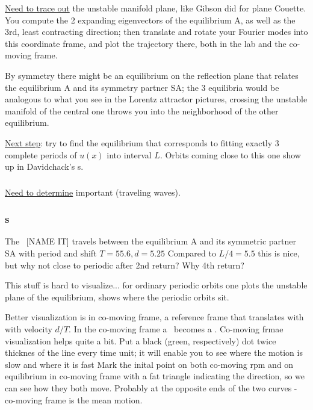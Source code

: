 \underline{Need to trace out}
the unstable manifold plane, like Gibson did for plane Couette.
You compute the 2 expanding eigenvectors of the
equilibrium A, as well as the 3rd, least contracting direction; then
translate and rotate your Fourier modes into this coordinate frame,
and plot the trajectory there, both in the lab and the co-moving frame.

By symmetry there might be an equilibrium on the reflection plane that
relates the equilibrium A and its symmetry partner SA; the 3 equilibria would
be analogous to what you see in the Lorentz attractor pictures, crossing
the unstable manifold of the central one throws you into the neighborhood
of the other equilibrium.

\underline{Next step}: try to find the equilibrium that corresponds to fitting
exactly 3 complete periods of $u(x)$ into interval $L$.
Orbits coming close to this one
show up in Davidchack's \rpo s.

\subsubsection{\Reqva}

\underline{Need to determine} important {\Reqva} (traveling waves).

\subsubsection{\Rpo s}


The \rpo\ [NAME IT] travels between the equilibrium A and its symmetric partner SA 
with period and shift
$T=55.6, d=5.25$
Compared to $L/4 = 5.5$
this is nice, but why not close to periodic after 2nd return? Why 4th return?


This stuff is hard to visualize... for ordinary periodic orbits one
plots the unstable plane of the equilibrium, shows where the periodic
orbits sit.

Better visualization is in co-moving frame, {\ie} 
a reference frame that translates with with velocity $d/T$.
In the co-moving frame a \rpo\ becomes
a \po.
Co-moving frmae visualization helps quite a bit. Put a black (green, respectively) dot
twice thicknes of the line every time unit; it will enable you to see
where the motion is slow and where it is fast
Mark the inital point on both
co-moving rpm and on equilibrium in co-moving frame with a fat triangle
indicating the direction, so we can see how they both move. Probably at the
opposite ends of the two curves - co-moving frame is the mean motion.

